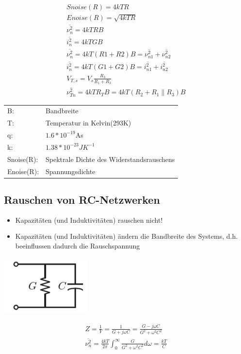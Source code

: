 \begin{minipage}{9cm}
\begin{gather}
Snoise(R)=4kTR\\
Enoise(R)=\sqrt{4kTR}\\
\overline{\nu^2_{n}}=4kTRB\\
\overline{i^2_{n}}=4kTGB\\
\overline{\nu^2_{n}}=4kT(R1+R2)B=\overline{\nu^2_{n1}}+\overline{\nu^2_{n2}}\\
\overline{i^2_{n}}=4kT(G1+G2)B=\overline{i^2_{n1}}+\overline{i^2_{n2}}\\
V_{T,s}=V_{s}\frac{R_{3}}{R_{1}+R_{3}}\\
\overline{\nu^2_{Tn}}=4kTR_{T}B=4kT(R_{2}+R_{1}\parallel R_{3})B
\end{gather}
\begin{tabular}{ll}
B:&Bandbreite\\
T:&Temperatur in Kelvin(293K)\\
q:&$1.6*10^{-19}$As\\
k:&$1.38*10^{-23}JK^{-1}$\\
Snoise(R):&Spektrale Dichte des Widerstandsrauschens\\
Enoise(R):&Spannungsdichte
\end{tabular}
\end{minipage}

\subsection{Rauschen von RC-Netzwerken}
\begin{itemize}
  \item Kapazitäten (und Induktivitäten) rauschen nicht!
  \item Kapazitäten (und Induktivitäten) ändern die Bandbreite des Systems, d.h.
  beeinflussen dadurch die Rauschspannung
\end{itemize}
\begin{minipage}{9cm}
\includegraphics[scale=0.4]{pictures/rcnetzwerk}
\end{minipage}
\begin{minipage}{9cm}
\begin{gather}
Z=\frac{1}{Y}=\frac{1}{G+j\omega C}=\frac{G-j\omega C}{G^2+\omega^2C^2}\\
\overline{\nu^2_{n}}=\frac{4kT}{2\pi}\int^{\infty}_{0}\frac{G}{G^2+\omega^2C^2}d\omega=\frac{kT}{C}
\end{gather}
\end{minipage}

